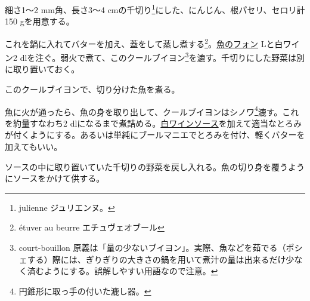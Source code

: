 \begin{recette}
細さ1〜2 mm角、長さ3〜4 cmの千切り\footnote{julienne ジュリエンヌ。}にした、にんじん、根パセリ、セロリ計150
gを用意する。

これを鍋に入れてバターを加え、蓋をして蒸し煮する\footnote{étuver au
  beurre エチュヴェオブール}。\protect\hyperlink{fumet-de-poisson}{魚のフォン}\troisquarts{}
Lと白ワイン2 dlを注ぐ。弱火で煮て、このクールブイヨン\footnote{court-bouillon
  原義は「量の少ないブイヨン」。実際、魚などを茹でる（ポシェする）際には、ぎりぎりの大きさの鍋を用いて煮汁の量は出来るだけ少なく済むようにする。誤解しやすい用語なので注意。}を漉す。千切りにした野菜は別に取り置いておく。

このクールブイヨンで、切り分けた魚を煮る。

魚に火が通ったら、魚の身を取り出して、クールブイヨンはシノワ\footnote{円錐形に取っ手の付いた漉し器。}漉す。これを約\unquart{}量すなわち2\undemi{}
dlになるまで煮詰める。\protect\hyperlink{sauce-vin-blanc}{白ワインソース}を加えて適当なとろみが付くようにする。あるいは単純にブールマニエでとろみを付け、軽くバターを加えてもいい。

ソースの中に取り置いていた千切りの野菜を戻し入れる。魚の切り身を覆うようにソースをかけて供する。
\end{recette}